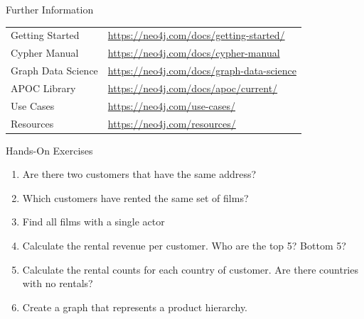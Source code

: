 \documentclass[ignorenonframetext,xcolor=x11names]{beamer}
\begin{document}
\begin{frame}{Further Information}
\renewcommand{\arraystretch}{1.5}
\footnotesize
\begin{tabularx}{\linewidth}{l|X} \hline
Getting Started & \url{https://neo4j.com/docs/getting-started/} \\ 
Cypher Manual & \url{https://neo4j.com/docs/cypher-manual} \\
Graph Data Science & \url{https://neo4j.com/docs/graph-data-science} \\ 
APOC Library & \url{https://neo4j.com/docs/apoc/current/} \\ 
Use Cases & \url{https://neo4j.com/use-cases/} \\
Resources & \url{https://neo4j.com/resources/} \\
\hline
\end{tabularx}
\end{frame}

\begin{frame}{Hands-On Exercises}
\begin{enumerate}
	\item Are there two customers that have the same address?
	\item Which customers have rented the same set of films?
	\item Find all films with a single actor
	\item Calculate the rental revenue per customer. Who are the top 5? Bottom 5?
	\item Calculate the rental counts for each country of customer. Are there countries with no rentals?
	\item Create a graph that represents a product hierarchy.
\end{enumerate}
\end{frame}
\end{document}
